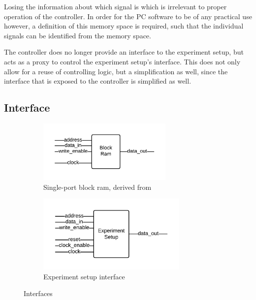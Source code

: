 \documentclass[openright]{template/uva-bachelor-thesis}
\begin{document}
Losing the information about which signal is which is irrelevant to proper operation of the controller. In order for the PC software to be of any practical use however, a definition of this memory space is required, such that the individual signals can be identified from the memory space. 

The controller does no longer provide an interface to the experiment setup, but acts as a proxy to control the experiment setup's interface. This does not only allow for a reuse of controlling logic, but a simplification as well, since the interface that is exposed to the controller is simplified as well.

\subsection{Interface}

\begin{figure}[h]
    \centering
    \begin{subfigure}[t]{0.5\textwidth}
        \centering
        \includegraphics[height=1.2in]{img/interface-bram}
        \caption{Single-port block ram, derived from \cite{RAMs68}}
        \label{fig:interface-bram}
    \end{subfigure}%
    \begin{subfigure}[t]{0.5\textwidth}
        \centering
        \includegraphics[height=1.5in]{img/interface-experiment}
        \caption{Experiment setup interface}
        \label{fig:interface-experiment}
    \end{subfigure}
    \caption{Interfaces}
    \label{fig:interfaces}
\end{figure}
\end{document}
